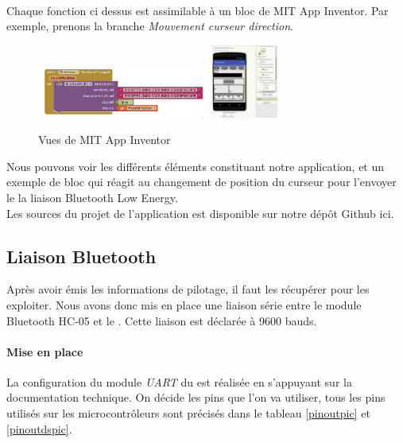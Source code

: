 		\\Chaque fonction ci dessus est assimilable à un bloc de MIT App Inventor. Par exemple, prenons la branche \textit{Mouvement curseur direction}.
		\begin{figure}
			\begin{center}		
				\includegraphics[width=0.5\textwidth]{../Illus/MITBlock.png}
				\includegraphics[width=0.2\textwidth]{../Illus/MITScreen.png}
			\end{center}
			\caption{Vues de MIT App Inventor}
		\end{figure}
		Nous pouvons voir les différents éléments constituant notre application, et un exemple de bloc qui réagit au changement de position du curseur pour l'envoyer le la liaison Bluetooth Low Energy.
		\\Les sources du projet de l'application est disponible sur notre dépôt Github ici\cite{git}.
			\subsection{Liaison Bluetooth}
			Après avoir émis les informations de pilotage, il faut les récupérer pour les exploiter. Nous avons donc mis en place une liaison série entre le module Bluetooth HC-05 et le \pic. Cette liaison est déclarée à 9600 bauds.
			\paragraph{Mise en place}La configuration du module \textit{UART} du \pic est réalisée en s'appuyant sur la documentation technique\cite{DatasheetPIC}. On décide les pins que l'on va utiliser, tous les pins utilisés sur les microcontrôleurs sont précisés dans le tableau \ref{pinoutpic} et \ref{pinoutdspic}.
			
			
